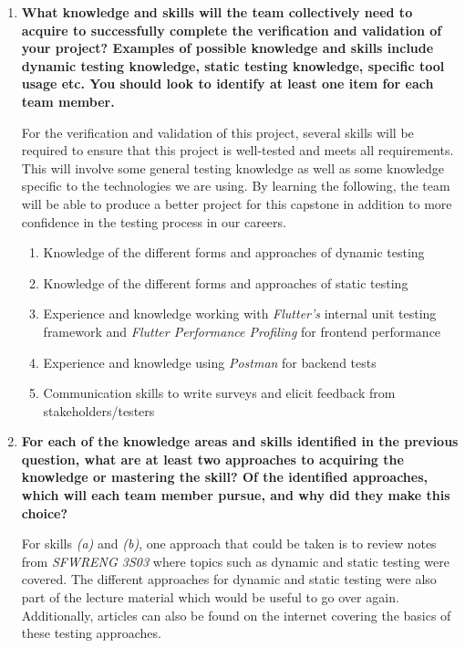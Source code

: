 \documentclass[12pt, titlepage]{article}
\begin{document}
\begin{enumerate}
  \item \textbf{What knowledge and skills will the team collectively need to acquire to
  successfully complete the verification and validation of your project?
  Examples of possible knowledge and skills include dynamic testing knowledge,
  static testing knowledge, specific tool usage etc.  You should look to
  identify at least one item for each team member.}

  For the verification and validation of this project, several skills will be required
  to ensure that this project is well-tested and meets all requirements. This will involve
  some general testing knowledge as well as some knowledge specific to the technologies we
  are using. By learning the following, the team will be able to produce a better project for this
  capstone in addition to more confidence in the testing process in our careers.
  \begin{enumerate}
    \item Knowledge of the different forms and approaches of dynamic testing
    \item Knowledge of the different forms and approaches of static testing
    \item Experience and knowledge working with \textit{Flutter's} internal unit testing framework and
    \textit{Flutter Performance Profiling} for frontend performance
    \item Experience and knowledge using \textit{Postman} for backend tests
    \item Communication skills to write surveys and elicit feedback from stakeholders/testers
  \end{enumerate}

  \item \textbf{For each of the knowledge areas and skills identified in the previous
  question, what are at least two approaches to acquiring the knowledge or
  mastering the skill?  Of the identified approaches, which will each team
  member pursue, and why did they make this choice?}

  For skills \textit{(a)} and \textit{(b)}, one approach that could be taken is to review notes from
  \textit{SFWRENG 3S03} where topics such as dynamic and static testing were covered. The different
  approaches for dynamic and static testing were also part of the lecture material which would be useful to go over again.
  Additionally, articles can also be found on the internet covering the basics of these
  testing approaches. \par


\end{enumerate}
\end{document}
